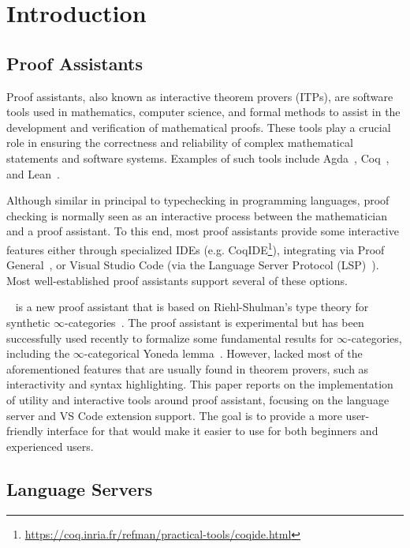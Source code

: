 \chapter{Introduction}
\label{chap:intro}

\section{Proof Assistants}

Proof assistants, also known as interactive theorem provers (ITPs),
are software tools used in mathematics, computer science, and formal methods
to assist in the development and verification of mathematical proofs.
These tools play a crucial role in ensuring the correctness and reliability
of complex mathematical statements and software systems.
Examples of such tools include Agda~\cite{BoveDybjerNorell2009}, Coq~\cite{BertotCasteran2013}, and Lean~\cite{deMouraUllrich2021}.

Although similar in principal to typechecking in programming languages,
proof checking is normally seen as an interactive process between the mathematician and a proof assistant.
To this end, most proof assistants provide some interactive features either through specialized IDEs
(e.g. CoqIDE\footnote{\url{https://coq.inria.fr/refman/practical-tools/coqide.html}}),
integrating via Proof General~\cite{Aspinall2000}, or Visual Studio Code
(via the Language Server Protocol (LSP)~\cite{Gunasinghe2022}).
Most well-established proof assistants support several of these options.

\Rzk{}~\cite{Kudasov2023-github-rzk} is a new proof assistant that is based on Riehl-Shulman's type theory for synthetic $\infty$-categories~\cite{Riehl2017}.
The proof assistant is experimental but has been successfully used recently to formalize some fundamental results for $\infty$-categories,
including the $\infty$-categorical Yoneda lemma~\cite{Kudasov2023}.
However, \Rzk{} lacked most of the aforementioned features that are usually found in theorem provers, such as interactivity and syntax highlighting.
This paper reports on the implementation of utility and interactive tools around \Rzk{} proof assistant, focusing on the language server and VS Code extension support.
The goal is to provide a more user-friendly interface for \Rzk{} that would make it easier to use for both beginners and experienced users.

\section{Language Servers}

